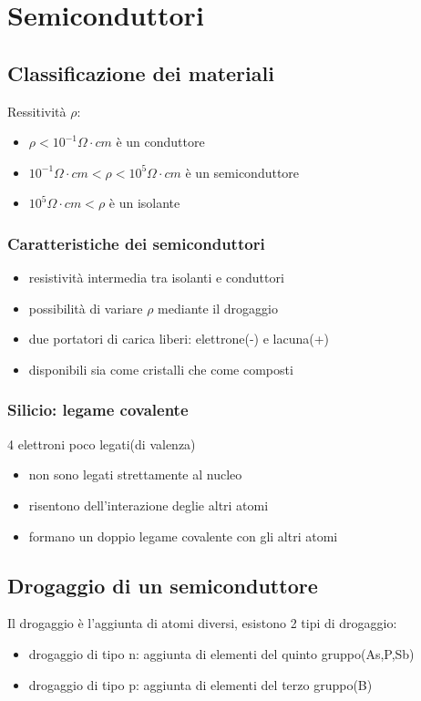 \section{Semiconduttori}
\subsection{Classificazione dei materiali}
Ressitività $\rho$:
\begin{itemize}
    \item $\rho < 10^{-1}\Omega\cdot cm$ è un conduttore
    \item $10^{-1}\Omega\cdot cm < \rho < 10^{5}\Omega\cdot cm $ è un semiconduttore
    \item $10^{5}\Omega\cdot cm < \rho$ è un isolante
\end{itemize}

\subsubsection{Caratteristiche dei semiconduttori}
\begin{itemize}
    \item resistività intermedia tra isolanti e conduttori
    \item possibilità di variare $\rho$ mediante il drogaggio
    \item due portatori di carica liberi: elettrone(-) e lacuna(+)
    \item disponibili sia come cristalli che come composti
\end{itemize}

\subsubsection{Silicio: legame covalente}
4 elettroni poco legati(di valenza)
\begin{itemize}
    \item non sono legati strettamente al nucleo
    \item risentono dell'interazione deglie altri atomi
    \item formano un doppio legame covalente con gli altri atomi
\end{itemize}

\subsection{Drogaggio di un semiconduttore}

Il drogaggio è l'aggiunta di atomi diversi, esistono 2 tipi di drogaggio:
\begin{itemize}
    \item drogaggio di tipo n: aggiunta di elementi del quinto gruppo(As,P,Sb)
    \item drogaggio di tipo p: aggiunta di elementi del terzo gruppo(B)
\end{itemize}


